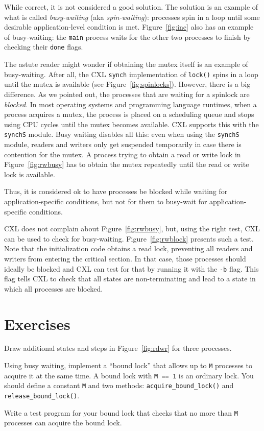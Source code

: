 \documentclass{report}
\begin{document}

While correct, it is not considered a good solution.
The solution is an example of what is called \emph{busy-waiting}
(aka \emph{spin-waiting}):
processes spin in a loop until some desirable application-level condition is met.
Figure~\ref{fig:inc} also has an example of busy-waiting: the \texttt{main}
process waits for the other two processes to finish by checking their \texttt{done}
flags.

The astute reader might wonder if obtaining the mutex itself is an
example of busy-waiting.  After all, the CXL \texttt{synch} implementation
of \texttt{lock()} spins in a loop until the mutex is available
(see Figure~\ref{fig:spinlocks}).
However, there is a big difference.  As we pointed out, the processes that
are waiting for a spinlock are \emph{blocked}.
In most operating systems and programming language runtimes,
when a process acquires a mutex, the process is placed on a scheduling
queue and stops using CPU cycles until the mutex becomes available.
CXL supports this with the \texttt{synchS} module.
Busy waiting disables all this: even when using the \texttt{synchS}
module, readers and writers only get suspended temporarily in case
there is contention for the mutex.
A process trying to obtain a read or write lock in
Figure~\ref{fig:rwbusy} has to obtain the mutex repeatedly
until the read or write lock is available.

Thus, it is considered ok to have processes be blocked while waiting
for application-specific conditions, but not for them to
busy-wait for application-specific conditions.

CXL does not complain about Figure~\ref{fig:rwbusy}, but, using
the right test, CXL can be used to check for busy-waiting.
Figure~\ref{fig:rwblock} presents such a test.
Note that the initialization code obtains a read lock, preventing
all readers and writers from entering the critical section.
In that case, those processes should ideally be blocked and CXL
can test for that by running it with the \texttt{-b} flag.
This flag tells CXL to check
that all states are non-terminating and lead to a state in which
all processes are blocked.

\section*{Exercises}
\begin{problems}
\item Draw additional states and steps in Figure~\ref{fig:rdwr}
for three processes.
\item Using busy waiting, implement a ``bound lock'' that allows
up to \texttt{M} processes to acquire it at the same time.  A bound lock
with \texttt{M == 1} is an ordinary lock.
You should define a constant \texttt{M} and two methods:
\texttt{acquire\_bound\_lock()}
and \texttt{release\_bound\_lock()}.
\item Write a test program for your bound lock
that checks that no more than \texttt{M} processes can acquire the
bound lock.
\end{problems}
\end{document}
